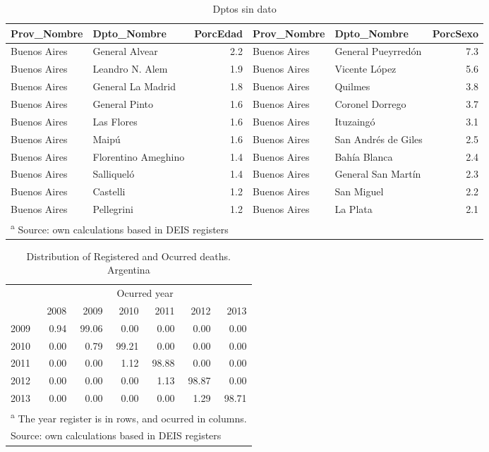 \documentclass[12pt,]{article}
\begin{document}
\begin{table}

\caption{\label{tab:UnkSexAge}Dptos sin dato}
\centering
\begin{tabular}[t]{l|l|r|l|l|r}
\hline
Prov\_Nombre & Dpto\_Nombre & PorcEdad & Prov\_Nombre & Dpto\_Nombre & PorcSexo\\
\hline
Buenos Aires & General Alvear & 2.2 & Buenos Aires & General Pueyrredón & 7.3\\
\hline
Buenos Aires & Leandro N. Alem & 1.9 & Buenos Aires & Vicente López & 5.6\\
\hline
Buenos Aires & General La Madrid & 1.8 & Buenos Aires & Quilmes & 3.8\\
\hline
Buenos Aires & General Pinto & 1.6 & Buenos Aires & Coronel Dorrego & 3.7\\
\hline
Buenos Aires & Las Flores & 1.6 & Buenos Aires & Ituzaingó & 3.1\\
\hline
Buenos Aires & Maipú & 1.6 & Buenos Aires & San Andrés de Giles & 2.5\\
\hline
Buenos Aires & Florentino Ameghino & 1.4 & Buenos Aires & Bahía Blanca & 2.4\\
\hline
Buenos Aires & Salliqueló & 1.4 & Buenos Aires & General San Martín & 2.3\\
\hline
Buenos Aires & Castelli & 1.2 & Buenos Aires & San Miguel & 2.2\\
\hline
Buenos Aires & Pellegrini & 1.2 & Buenos Aires & La Plata & 2.1\\
\hline
\multicolumn{6}{l}{\textsuperscript{a} Source: own calculations based in DEIS registers}\\
\end{tabular}
\end{table}

\begin{table}

\caption{\label{tab:def_tardias}Distribution of Registered and Ocurred deaths. Argentina}
\centering
\begin{tabular}[t]{l|r|r|r|r|r|r}
\hline
\multicolumn{1}{c|}{ } & \multicolumn{6}{c}{Ocurred year} \\
\cline{2-7}
  & 2008 & 2009 & 2010 & 2011 & 2012 & 2013\\
\hline
2009 & 0.94 & 99.06 & 0.00 & 0.00 & 0.00 & 0.00\\
\hline
2010 & 0.00 & 0.79 & 99.21 & 0.00 & 0.00 & 0.00\\
\hline
2011 & 0.00 & 0.00 & 1.12 & 98.88 & 0.00 & 0.00\\
\hline
2012 & 0.00 & 0.00 & 0.00 & 1.13 & 98.87 & 0.00\\
\hline
2013 & 0.00 & 0.00 & 0.00 & 0.00 & 1.29 & 98.71\\
\hline
\multicolumn{7}{l}{\textsuperscript{a} The year register is in rows, and ocurred in columns.}\\
\multicolumn{7}{l}{Source: own calculations based in DEIS registers}\\
\end{tabular}
\end{table}
\end{document}

